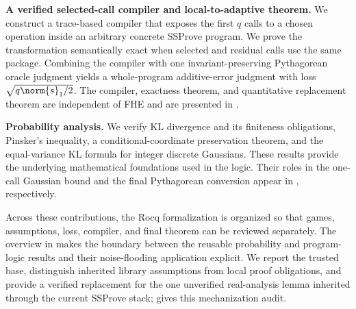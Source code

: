 \textbf{A verified selected-call compiler and local-to-adaptive theorem.}
We construct a trace-based compiler that exposes the first \(q\) calls to a
chosen operation inside an arbitrary concrete SSProve program.  We prove the
transformation semantically exact when selected and residual calls use the
same package.  Combining the compiler with one
invariant-preserving Pythagorean oracle judgment yields a whole-program
additive-error judgment with loss \(\sqrt{q\norm{s}_1/2}\).  The compiler,
exactness theorem, and quantitative replacement theorem are independent of
FHE and are presented in .

\textbf{Probability analysis.} We verify KL divergence and its finiteness obligations, Pinsker's inequality, a conditional-coordinate preservation theorem, and the equal-variance KL formula for integer discrete Gaussians.
These results provide the underlying mathematical foundations used in the logic.
Their roles in the one-call Gaussian bound and the final Pythagorean conversion
appear in , respectively.

Across these contributions, the Rocq formalization is organized so that games,
assumptions, loss, compiler, and final theorem can be reviewed separately.
The overview in  makes the boundary between the reusable
probability and program-logic results and their noise-flooding application
explicit.  We report the trusted base, distinguish inherited library
assumptions from local proof obligations, and provide a verified replacement
for the one unverified real-analysis lemma inherited through the current
SSProve stack;  gives this mechanization audit.
